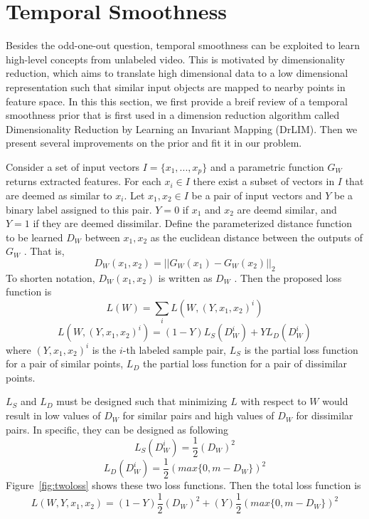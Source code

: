 \section{Temporal Smoothness}

Besides the odd-one-out question, temporal smoothness can be exploited to learn high-level concepts from unlabeled video.
This is motivated by dimensionality reduction, which aims to translate high dimensional data to a low dimensional representation such that similar input objects are mapped to nearby points in feature space. 
In this this section, we first provide a breif review of a temporal smoothness prior that is first used in a dimension reduction algorithm called Dimensionality Reduction by Learning an Invariant Mapping (DrLIM)\cite{LeCun2006DrLIM}. Then we present several improvements on the prior and fit it in our problem. 

Consider a set of input vectors $I = \{x_1, ..., x_p\}$ and a parametric function $G_W$ returns extracted features. 
For each $x_i \in I$ there exist a subset of vectors in $I$ that are deemed as similar to $x_i$.  
Let $x_1, x_2 \in I$ be a pair of input vectors and $Y$ be a binary label assigned to this pair.
$Y = 0$ if $x_1$ and $x_2$ are deemd similar, and $Y = 1$ if they are deemed dissimilar.
Define the parameterized distance function to be learned $D_W$ between $x_1, x_2$ as the euclidean distance between the outputs of $G_W$ . 
That is,
$$D_W(x_1, x_2) = || G_W(x_1) - G_W(x_2)||_2$$
To shorten notation, $D_W (x_1, x_2)$ is written as $D_W$ . Then the proposed loss function is
$$L(W) = \sum_i L(W, (Y, x_1, x_2)^i) $$
$$L(W, (Y, x_1, x_2)^i) = (1-Y) L_S (D_W^i) + Y L_D (D_W^i)$$
where $(Y, x_1, x_2)^i$ is the $i$-th labeled sample pair, $L_S$ is the partial loss function for a pair of similar points, $L_D$ the partial loss function for a pair of dissimilar points. 

$L_S$ and $L_D$ must be designed such that minimizing $L$ with respect to $W$ would result in low values of $D_W$ for similar pairs and high values of $D_W$ for dissimilar pairs. In specific, they can be designed as following 
$$L_S (D_W^i) = \frac{1}{2} (D_W)^2$$
$$L_D (D_W^i) = \frac{1}{2} (max\{0, m - D_W\})^2$$
Figure~\ref{fig:twoloss} shows these two loss functions. Then the total loss function is 
$$L(W, Y, x_1, x_2) = (1-Y) \frac{1}{2} (D_W)^2 + (Y) \frac{1}{2} (max\{0, m - D_W\})^2$$

